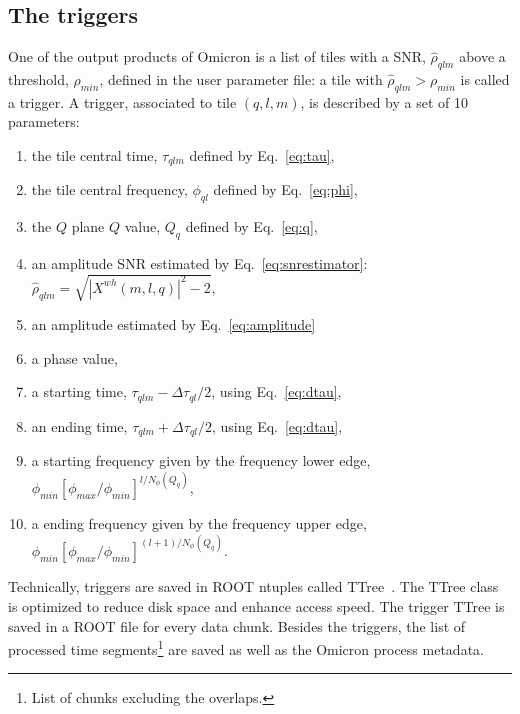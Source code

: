 \subsection{The triggers} \label{sec:algorithm:triggering}
One of the output products of Omicron is a list of tiles with a SNR, $\hat{\rho}_{qlm}$ above a threshold, $\rho_{min}$, defined in the user parameter file: a tile with $\hat{\rho}_{qlm} > \rho_{min}$ is called a trigger. A trigger, associated to tile $(q,l,m)$, is described by a set of 10 parameters:
\begin{enumerate}
  \item the tile central time, $\tau_{qlm}$ defined by Eq.~\ref{eq:tau},
  \item the tile central frequency, $\phi_{ql}$ defined by Eq.~\ref{eq:phi},
  \item the $Q$ plane $Q$ value, $Q_{q}$ defined by Eq.~\ref{eq:q},
  \item an amplitude SNR estimated by Eq.~\ref{eq:snrestimator}: $\hat{\rho}_{qlm} = \sqrt{ |X^{wh}(m,l,q)|^2-2}$,
  \item an amplitude estimated by Eq.~\ref{eq:amplitude}
  \item a phase value, 
  \item a starting time, $\tau_{qlm} - \Delta \tau_{ql}/2$, using Eq.~\ref{eq:dtau},
  \item an ending time, $\tau_{qlm} +\Delta \tau_{ql}/2$, using Eq.~\ref{eq:dtau},
  \item a starting frequency given by the frequency lower edge, $\phi_{min}[\phi_{max}/\phi_{min}]^{l/N_{\phi}(Q_q)}$,
  \item a ending frequency given by the frequency upper edge, $\phi_{min}[\phi_{max}/\phi_{min}]^{(l+1)/N_{\phi}(Q_q)}$.
\end{enumerate}
Technically, triggers are saved in ROOT ntuples called TTree~\cite{Brun:1997pa}. The TTree class is optimized to reduce disk space and enhance access speed. The trigger TTree is saved in a ROOT file for every data chunk. Besides the triggers, the list of processed time segments\footnote{List of chunks excluding the overlaps.} are saved as well as the Omicron process metadata.


